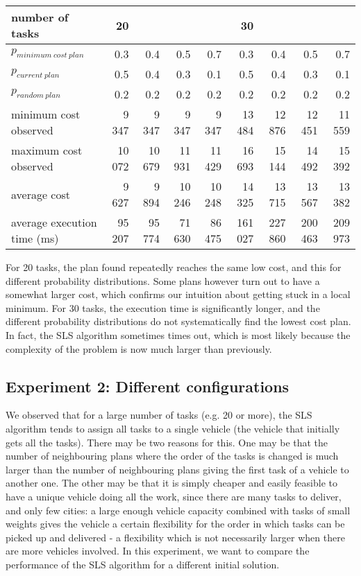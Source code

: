 \documentclass[10pt]{article}
\begin{document}
\begin{tabular}{|l|rrrr|rrrr|}
\hline
number of tasks & 20 & & & & 30 & & & \\
\hline
$p_{minimum\ cost\ plan}$ & 0.3 & 0.4 & 0.5 & 0.7 & 0.3 & 0.4 & 0.5 & 0.7\\
$p_{current\ plan}$       & 0.5 & 0.4 & 0.3 & 0.1 & 0.5 & 0.4 & 0.3 & 0.1\\
$p_{random\ plan}$        & 0.2 & 0.2 & 0.2 & 0.2 & 0.2 & 0.2 & 0.2 & 0.2\\
\hline
minimum cost observed &  9 347 &  9 347 &  9 347 &  9 347 & 13 484 & 12 876 & 12 451 & 11 559\\
maximum cost observed & 10 072 & 10 679 & 11 931 & 11 429 & 16 693 & 15 144 & 14 492 & 15 392\\
\hline
average cost                &  9 627 &  9 894 & 10 246 & 10 248 &  14 325 &  13 715 &  13 567 & 13 382\\
average execution time (ms) & 95 207 & 95 774 & 71 630 & 86 475 & 161 027 & 227 860 & 200 463 & 209 973\\
\hline
\end{tabular}
\label{table:model_parameters}
\vspace{4mm}
For 20 tasks, the plan found repeatedly reaches the same low cost, and this for different probability distributions. 
Some plans however turn out to have a somewhat larger cost, which confirms our intuition about getting stuck in a local minimum. 
For 30 tasks, the execution time is significantly longer, and the different probability distributions do not systematically find the lowest cost plan. In fact, the SLS algorithm sometimes times out, which is most likely because the complexity of the problem is now much larger than previously.

\subsection{Experiment 2: Different configurations}
We observed that for a large number of tasks (e.g. 20 or more), the SLS algorithm tends to assign all tasks to a single vehicle (the vehicle that initially gets all the tasks).
There may be two reasons for this. One may be that the number of neighbouring plans where the order of the tasks is changed is much larger than the number of neighbouring plans giving the first task of a vehicle to another one. 
The other may be that it is simply cheaper and easily feasible to have a unique vehicle doing all the work, since there are many tasks to deliver, and only few cities: a large enough vehicle capacity combined with tasks of small weights gives the vehicle a certain flexibility for the order in which tasks can be picked up and delivered - a flexibility which is not necessarily larger when there are more vehicles involved.
In this experiment, we want to compare the performance of the SLS algorithm for a different initial solution. 
\end{document}
